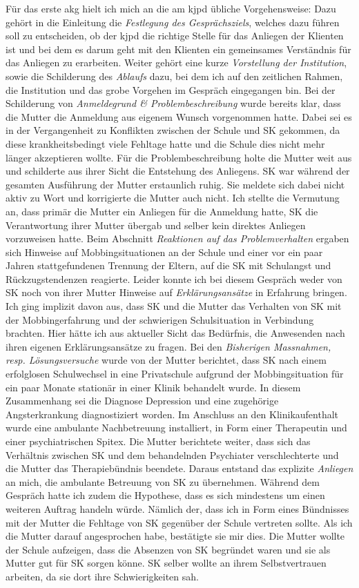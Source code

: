 Für das erste \ac{akg} hielt ich mich an die am \ac{kjpd} übliche Vorgehensweise: Dazu gehört in die Einleitung die \textit{Festlegung des Gesprächsziels}, welches dazu führen soll zu entscheiden, ob der \ac{kjpd} die richtige Stelle für das Anliegen der Klienten ist und bei dem es darum geht mit den Klienten ein gemeinsames Verständnis für das Anliegen zu erarbeiten. Weiter gehört eine kurze \textit{Vorstellung der Institution}, sowie die Schilderung des \textit{Ablaufs} dazu, bei dem ich auf den zeitlichen Rahmen, die Institution und das grobe Vorgehen im Gespräch eingegangen bin. Bei der Schilderung von \textit{Anmeldegrund \& Problembeschreibung} wurde bereits klar, dass die Mutter die Anmeldung aus eigenem Wunsch vorgenommen hatte. Dabei sei es in der Vergangenheit zu Konflikten zwischen der Schule und SK gekommen, da diese krankheitsbedingt viele Fehltage hatte und die Schule dies nicht mehr länger akzeptieren wollte. Für die Problembeschreibung holte die Mutter weit aus und schilderte aus ihrer Sicht die Entstehung des Anliegens. SK war während der gesamten Ausführung der Mutter erstaunlich ruhig. Sie meldete sich dabei nicht aktiv zu Wort und korrigierte die Mutter auch nicht. Ich stellte die Vermutung an, dass primär die Mutter ein Anliegen für die Anmeldung hatte, SK die Verantwortung ihrer Mutter übergab und selber kein direktes Anliegen vorzuweisen hatte. Beim Abschnitt \textit{Reaktionen auf das Problemverhalten} ergaben sich Hinweise auf Mobbingsituationen an der Schule und einer vor ein paar Jahren stattgefundenen Trennung der Eltern, auf die SK mit Schulangst und Rückzugstendenzen reagierte. Leider konnte ich bei diesem Gespräch weder von SK noch von ihrer Mutter Hinweise auf \textit{Erklärungsansätze} in Erfahrung bringen. Ich ging implizit davon aus, dass SK und die Mutter das Verhalten von SK mit der Mobbingerfahrung und der schwierigen Schulsituation in Verbindung brachten. Hier hätte ich aus aktueller Sicht das Bedürfnis, die Anwesenden nach ihren eigenen Erklärungsansätze zu fragen. Bei den \textit{Bisherigen Massnahmen, resp. Lösungsversuche} wurde von der Mutter berichtet, dass SK nach einem erfolglosen Schulwechsel in eine Privatschule aufgrund der Mobbingsituation für ein paar Monate stationär in einer Klinik behandelt wurde. In diesem Zusammenhang sei die Diagnose Depression und eine zugehörige Angsterkrankung diagnostiziert worden. Im Anschluss an den Klinikaufenthalt wurde eine ambulante Nachbetreuung installiert, in Form einer Therapeutin und einer  psychiatrischen Spitex. Die Mutter berichtete weiter, dass sich das Verhältnis zwischen SK und dem behandelnden Psychiater verschlechterte und die Mutter das Therapiebündnis beendete. Daraus entstand das explizite \textit{Anliegen} an mich, die ambulante Betreuung von SK zu übernehmen. Während dem Gespräch hatte ich zudem die Hypothese, dass es sich mindestens um einen weiteren Auftrag handeln würde. Nämlich der, dass ich in Form eines Bündnisses mit der Mutter die Fehltage von SK gegenüber der Schule vertreten sollte. Als ich die Mutter darauf angesprochen habe, bestätigte sie mir dies. Die Mutter wollte der Schule aufzeigen, dass die Absenzen von SK begründet waren und sie als Mutter gut für SK sorgen könne. SK selber wollte an ihrem Selbstvertrauen arbeiten, da sie dort ihre Schwierigkeiten sah. 